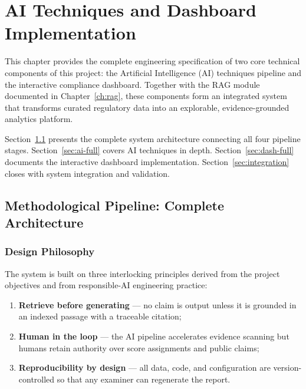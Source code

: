 \chapter{AI Techniques and Dashboard Implementation}
\label{ch:techimpl}

This chapter provides the complete engineering specification of two core technical
components of this project: the Artificial Intelligence (AI) techniques pipeline and
the interactive compliance dashboard. Together with the RAG module documented in
Chapter~\ref{ch:rag}, these components form an integrated system that transforms
curated regulatory data into an explorable, evidence-grounded analytics platform.

Section~\ref{sec:full-pipeline} presents the complete system architecture connecting
all four pipeline stages. Section~\ref{sec:ai-full} covers AI techniques in depth.
Section~\ref{sec:dash-full} documents the interactive dashboard implementation.
Section~\ref{sec:integration} closes with system integration and validation.

\section{Methodological Pipeline: Complete Architecture}
\label{sec:full-pipeline}

\subsection{Design Philosophy}
\label{sec:pipeline-philosophy}

The system is built on three interlocking principles derived from the project
objectives and from responsible-AI engineering practice:

\begin{enumerate}[noitemsep]
  \item \textbf{Retrieve before generating} --- no claim is output unless it is
        grounded in an indexed passage with a traceable citation;
  \item \textbf{Human in the loop} --- the AI pipeline accelerates evidence
        scanning but humans retain authority over score assignments and public
        claims;
  \item \textbf{Reproducibility by design} --- all data, code, and configuration
        are version-controlled so that any examiner can regenerate the report.
\end{enumerate}


